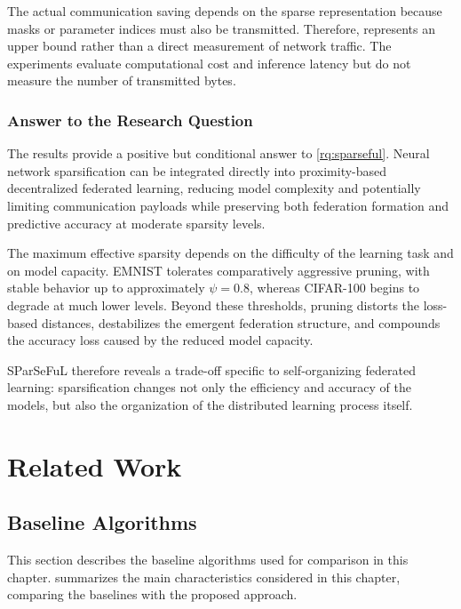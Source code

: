 The actual communication saving depends on the sparse representation because
 masks or parameter indices must also be transmitted.
%
Therefore, 
  represents an upper
 bound rather than a direct measurement of network traffic.
%
The experiments evaluate computational cost 
 and inference latency but do not measure the number of transmitted bytes.

\subsubsection{Answer to the Research Question}

The results provide a positive but conditional answer to \ref{rq:sparseful}.
%
Neural network sparsification can be integrated directly into proximity-based decentralized federated learning, 
 reducing model complexity and potentially limiting communication payloads 
 while preserving both federation formation and predictive accuracy at moderate sparsity levels.

The maximum effective sparsity depends on the difficulty of the learning task
 and on model capacity.
%
EMNIST tolerates comparatively aggressive pruning, 
 with stable behavior up to approximately \(\psi=0.8\), 
 whereas CIFAR-100 begins to degrade at much lower levels.
%
Beyond these thresholds, 
 pruning distorts the loss-based distances, destabilizes the emergent federation structure, 
 and compounds the accuracy loss caused by the reduced model capacity.

SParSeFuL therefore reveals a trade-off specific to self-organizing federated learning: 
 sparsification changes not only the efficiency and accuracy of the models, 
 but also the organization of the distributed learning process itself.


\section{Related Work}
\label{sec:selforgfl-related}

\subsection{Baseline Algorithms}

This section describes the baseline algorithms used for comparison in this chapter.
%
 summarizes the main characteristics considered in this chapter, 
 comparing the baselines with the proposed approach.

